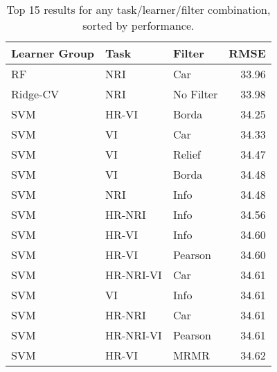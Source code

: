 \begin{table}[h!]
\centering
\caption{Top 15 results for any task/learner/filter combination, sorted by performance.} 
\begin{tabular}{lllr}
  \hline
Learner Group & Task & Filter & RMSE \\ 
  \hline
RF & NRI & Car & 33.96 \\ 
  Ridge-CV & NRI & No Filter & 33.98 \\ 
  SVM & HR-VI & Borda & 34.25 \\ 
  SVM & VI & Car & 34.33 \\ 
  SVM & VI & Relief & 34.47 \\ 
  SVM & VI & Borda & 34.48 \\ 
  SVM & NRI & Info & 34.48 \\ 
  SVM & HR-NRI & Info & 34.56 \\ 
  SVM & HR-VI & Info & 34.60 \\ 
  SVM & HR-VI & Pearson & 34.60 \\ 
  SVM & HR-NRI-VI & Car & 34.61 \\ 
  SVM & VI & Info & 34.61 \\ 
  SVM & HR-NRI & Car & 34.61 \\ 
  SVM & HR-NRI-VI & Pearson & 34.61 \\ 
  SVM & HR-VI & MRMR & 34.62 \\ 
   \hline
\end{tabular}
\end{table}
